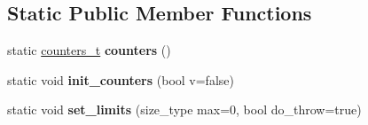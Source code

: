 \subsection*{Static Public Member Functions}
\begin{DoxyCompactItemize}
\item 
\hypertarget{classstatic__counting__allocator_a4c7b7d03b5a1883ebd72d7ce58817ee2}{}static \hyperlink{structallocator__counters}{counters\+\_\+t} {\bfseries counters} ()\label{classstatic__counting__allocator_a4c7b7d03b5a1883ebd72d7ce58817ee2}

\item 
\hypertarget{classstatic__counting__allocator_a967264fee6779578b9dcab61c223746c}{}static void {\bfseries init\+\_\+counters} (bool v=false)\label{classstatic__counting__allocator_a967264fee6779578b9dcab61c223746c}

\item 
\hypertarget{classstatic__counting__allocator_a3ffe719a70e756f01ab425cef737ba7c}{}static void {\bfseries set\+\_\+limits} (size\+\_\+type max=0, bool do\+\_\+throw=true)\label{classstatic__counting__allocator_a3ffe719a70e756f01ab425cef737ba7c}

\end{DoxyCompactItemize}

